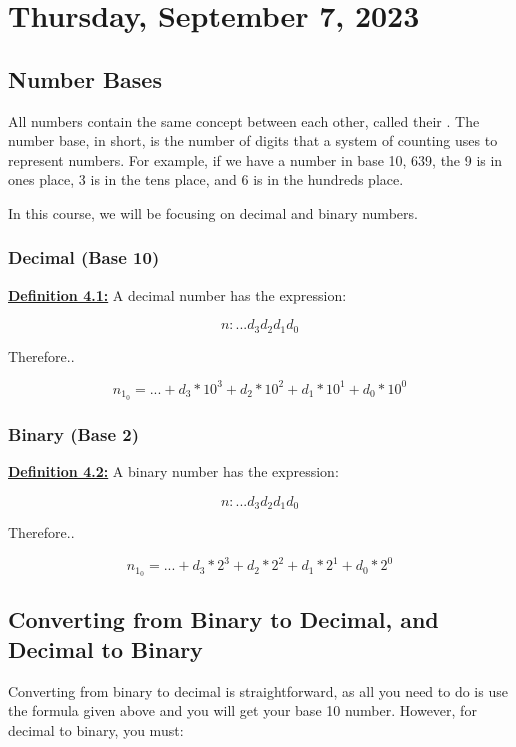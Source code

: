 \section{Thursday, September 7, 2023}

\subsection{Number Bases}
All numbers contain the same concept between each other, called their . The number base, in short, is the number of digits that a system of counting uses to represent numbers. For example, if we have a number in base 10, 639, the 9 is in ones place, 3 is in the tens place, and 6 is in the hundreds place.

In this course, we will be focusing on decimal and binary numbers.

\subsubsection{Decimal (Base 10)}
\textbf{\underline{Definition 4.1:}} A decimal number has the expression:

\begin{displaymath}
    n : ...d_3d_2d_1d_0
\end{displaymath}

Therefore..

\begin{displaymath}
    n_1_0 = ... + d_3 * 10^3 + d_2 * 10^2 + d_1 * 10^1 + d_0 * 10^0
\end{displaymath}

\subsubsection{Binary (Base 2)}
\textbf{\underline{Definition 4.2:}} A binary number has the expression:

\begin{displaymath}
    n : ...d_3d_2d_1d_0
\end{displaymath}

Therefore..

\begin{displaymath}
    n_1_0 = ... + d_3 * 2^3 + d_2 * 2^2 + d_1 * 2^1 + d_0 * 2^0
\end{displaymath}

\subsection{Converting from Binary to Decimal, and Decimal to Binary}
Converting from binary to decimal is straightforward, as all you need to do is use the formula given above and you will get your base 10 number. However, for decimal to binary, you must:

